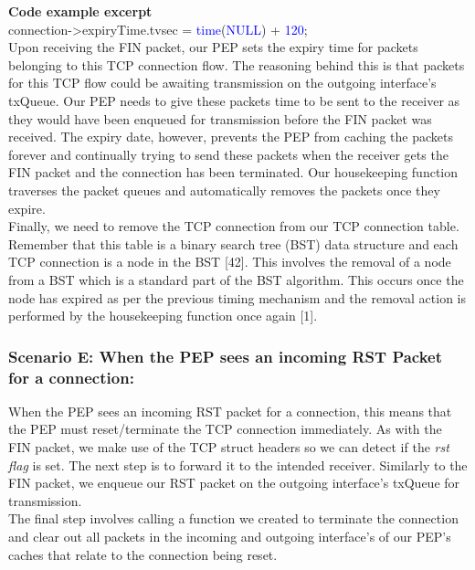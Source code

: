 \documentclass{uathesis}
\begin{document}
\noindent \textbf{Code example excerpt}\\
connection->expiryTime.tv\textunderscore sec = \textcolor{blue}{time}(\textcolor{blue}{NULL}) + \textcolor{blue}{120}; \\

Upon receiving the FIN packet, our PEP sets the expiry time for packets belonging to this TCP connection flow. The reasoning behind this is that packets for this TCP flow could be awaiting transmission on the outgoing interface's txQueue. Our PEP needs to give these packets time to be sent to the receiver as they would have been enqueued for transmission before the FIN packet was received. The expiry date, however, prevents the PEP from caching the packets forever and continually trying to send these packets when the receiver gets the FIN packet and the connection has been terminated. Our housekeeping function traverses the packet queues and automatically removes the packets once they expire.\\

Finally, we need to remove the TCP connection from our TCP connection table. Remember that this table is a binary search tree (BST) data structure and each TCP connection is a node in the BST [42]. This involves the removal of a node from a BST which is a standard part of the BST algorithm. This occurs once the node has expired as per the previous timing mechanism and the removal action is performed by the housekeeping function once again [1].

\subsubsection{Scenario E: When the PEP sees an incoming RST Packet for a connection:}
When the PEP sees an incoming RST packet for a connection, this means that the PEP must reset/terminate the TCP connection immediately. As with the FIN packet, we make use of the TCP struct headers so we can detect if the \emph{rst flag} is set. The next step is to forward it to the intended receiver. Similarly to the FIN packet, we enqueue our RST packet on the outgoing interface's txQueue for transmission.\\ 

The final step involves calling a function we created to terminate the connection and clear out all packets in the incoming and outgoing interface's  of our PEP's caches that relate to the connection being reset. \\
\end{document}
